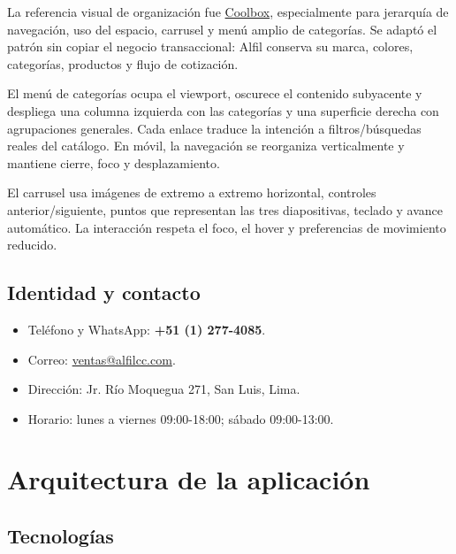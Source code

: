 \documentclass[11pt,a4paper]{article}
\begin{document}
La referencia visual de organización fue \href{https://www.coolbox.pe/}{Coolbox}, especialmente para jerarquía de navegación, uso del espacio, carrusel y menú amplio de categorías. Se adaptó el patrón sin copiar el negocio transaccional: Alfil conserva su marca, colores, categorías, productos y flujo de cotización.

El menú de categorías ocupa el viewport, oscurece el contenido subyacente y despliega una columna izquierda con las categorías y una superficie derecha con agrupaciones generales. Cada enlace traduce la intención a filtros/búsquedas reales del catálogo. En móvil, la navegación se reorganiza verticalmente y mantiene cierre, foco y desplazamiento.

El carrusel usa imágenes de extremo a extremo horizontal, controles anterior/siguiente, puntos que representan las tres diapositivas, teclado y avance automático. La interacción respeta el foco, el hover y preferencias de movimiento reducido.

\subsection{Identidad y contacto}

\begin{itemize}
  \item Teléfono y WhatsApp: \textbf{+51 (1) 277-4085}.
  \item Correo: \href{mailto:ventas@alfilcc.com}{ventas@alfilcc.com}.
  \item Dirección: Jr. Río Moquegua 271, San Luis, Lima.
  \item Horario: lunes a viernes 09:00-18:00; sábado 09:00-13:00.
\end{itemize}

\section{Arquitectura de la aplicación}

\subsection{Tecnologías}
\end{document}

